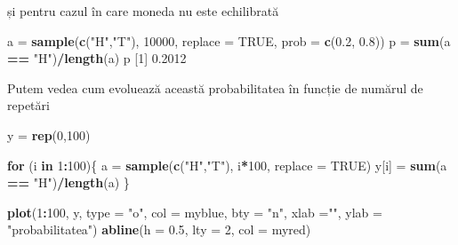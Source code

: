 \documentclass[]{article}
\newenvironment{Shaded}{\begin{snugshade}}{\end{snugshade}}
\newcommand{\ControlFlowTok}[1]{\textcolor[rgb]{0.13,0.29,0.53}{\textbf{#1}}}
\newcommand{\DataTypeTok}[1]{\textcolor[rgb]{0.13,0.29,0.53}{#1}}
\newcommand{\DecValTok}[1]{\textcolor[rgb]{0.00,0.00,0.81}{#1}}
\newcommand{\FloatTok}[1]{\textcolor[rgb]{0.00,0.00,0.81}{#1}}
\newcommand{\KeywordTok}[1]{\textcolor[rgb]{0.13,0.29,0.53}{\textbf{#1}}}
\newcommand{\NormalTok}[1]{#1}
\newcommand{\OperatorTok}[1]{\textcolor[rgb]{0.81,0.36,0.00}{\textbf{#1}}}
\newcommand{\OtherTok}[1]{\textcolor[rgb]{0.56,0.35,0.01}{#1}}
\newcommand{\StringTok}[1]{\textcolor[rgb]{0.31,0.60,0.02}{#1}}
\begin{document}
și pentru cazul în care moneda nu este echilibrată

\begin{Shaded}
\begin{Highlighting}[]
\NormalTok{a =}\StringTok{ }\KeywordTok{sample}\NormalTok{(}\KeywordTok{c}\NormalTok{(}\StringTok{"H"}\NormalTok{,}\StringTok{"T"}\NormalTok{), }\DecValTok{10000}\NormalTok{, }\DataTypeTok{replace =} \OtherTok{TRUE}\NormalTok{, }\DataTypeTok{prob =} \KeywordTok{c}\NormalTok{(}\FloatTok{0.2}\NormalTok{, }\FloatTok{0.8}\NormalTok{))}
\NormalTok{p =}\StringTok{ }\KeywordTok{sum}\NormalTok{(a }\OperatorTok{==}\StringTok{ "H"}\NormalTok{)}\OperatorTok{/}\KeywordTok{length}\NormalTok{(a)}
\NormalTok{p}
\NormalTok{[}\DecValTok{1}\NormalTok{] }\FloatTok{0.2012}
\end{Highlighting}
\end{Shaded}

Putem vedea cum evoluează această probabilitatea în funcție de numărul
de repetări

\begin{Shaded}
\begin{Highlighting}[]
\NormalTok{y =}\StringTok{ }\KeywordTok{rep}\NormalTok{(}\DecValTok{0}\NormalTok{,}\DecValTok{100}\NormalTok{)}

\ControlFlowTok{for}\NormalTok{ (i }\ControlFlowTok{in} \DecValTok{1}\OperatorTok{:}\DecValTok{100}\NormalTok{)\{}
\NormalTok{  a =}\StringTok{ }\KeywordTok{sample}\NormalTok{(}\KeywordTok{c}\NormalTok{(}\StringTok{"H"}\NormalTok{,}\StringTok{"T"}\NormalTok{), i}\OperatorTok{*}\DecValTok{100}\NormalTok{, }\DataTypeTok{replace =} \OtherTok{TRUE}\NormalTok{)}
\NormalTok{  y[i] =}\StringTok{ }\KeywordTok{sum}\NormalTok{(a }\OperatorTok{==}\StringTok{ "H"}\NormalTok{)}\OperatorTok{/}\KeywordTok{length}\NormalTok{(a)}
\NormalTok{\}}

\KeywordTok{plot}\NormalTok{(}\DecValTok{1}\OperatorTok{:}\DecValTok{100}\NormalTok{, y, }\DataTypeTok{type =} \StringTok{"o"}\NormalTok{, }\DataTypeTok{col =}\NormalTok{ myblue, }\DataTypeTok{bty =} \StringTok{"n"}\NormalTok{,}
     \DataTypeTok{xlab =}\StringTok{""}\NormalTok{, }\DataTypeTok{ylab =} \StringTok{"probabilitatea"}\NormalTok{)}
\KeywordTok{abline}\NormalTok{(}\DataTypeTok{h =} \FloatTok{0.5}\NormalTok{, }\DataTypeTok{lty =} \DecValTok{2}\NormalTok{, }\DataTypeTok{col =}\NormalTok{ myred)}
\end{Highlighting}
\end{Shaded}
\end{document}
